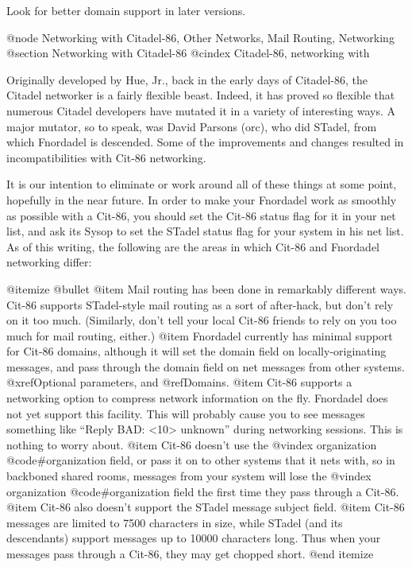 {{{{Look for better domain support in later versions.

@node Networking with Citadel-86, Other Networks, Mail Routing, Networking
@section Networking with Citadel-86
@cindex Citadel-86, networking with

Originally developed by Hue, Jr., back in the early days of
Citadel-86, the Citadel networker is a fairly flexible beast.  Indeed, it
has proved so flexible that numerous Citadel developers have mutated it in
a variety of interesting ways.  A major mutator, so to speak, was David
Parsons (orc), who did STadel, from which Fnordadel is descended.  Some
of the improvements and changes resulted in incompatibilities with Cit-86
networking.

It is our intention to eliminate or work around all of these
things at some point, hopefully in the near future.  In order to make your
Fnordadel work as smoothly as possible with a Cit-86, you should set the
Cit-86 status flag for it in your net list, and ask its Sysop to set the
STadel status flag for your system in his net list.   As of this
writing, the following are the areas in which Cit-86 and Fnordadel
networking differ:

@itemize @bullet
@item
Mail routing has been done in remarkably different ways.  Cit-86
supports STadel-style mail routing as a sort of after-hack, but
don't rely on it too much.  (Similarly, don't tell your local
Cit-86 friends to rely on you too much for mail routing, either.)
@item
Fnordadel currently has minimal support for Cit-86 domains, although
it will set the domain field on locally-originating messages, and pass
through the domain field on net messages from other systems.
@xref{Optional parameters}, and @ref{Domains}.
@item
Cit-86 supports a networking option to compress network information on
the fly.  Fnordadel does not yet support this facility.  This will
probably cause you to see messages something like ``Reply BAD: <10> unknown''
during networking sessions.  This is nothing to worry about.
@item
Cit-86 doesn't use the
@vindex organization
@code{#organization} field, or pass it on to other
systems that it nets with, so in backboned shared rooms, messages
from your system will lose the
@vindex organization
@code{#organization} field the first time
they pass through a Cit-86.
@item
Cit-86 also doesn't support the STadel message subject field.
@item
Cit-86 messages are limited to 7500 characters in size, while STadel
(and its descendants) support messages up to 10000 characters long.
Thus when your messages pass through a Cit-86, they may get chopped
short.
@end itemize

}}}}
